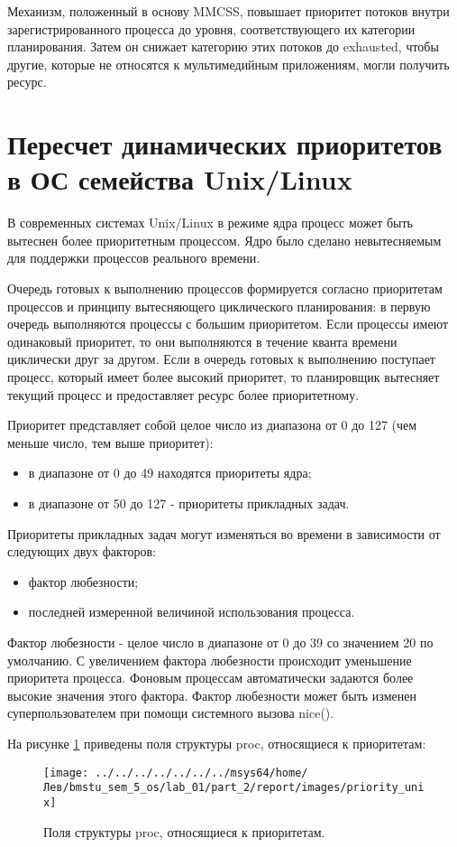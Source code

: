 Механизм, положенный в основу MMCSS, повышает приоритет потоков внутри зарегистрированного процесса до уровня, соответствующего их категории планирования. Затем он снижает категорию этих потоков до exhausted, чтобы другие, которые не относятся к мультимедийным приложениям, могли получить ресурс.

\section{Пересчет динамических приоритетов в ОС семейства Unix/Linux}
В современных системах Unix/Linux в режиме ядра процесс может быть вытеснен более приоритетным процессом. Ядро было сделано невытесняемым для поддержки процессов реального времени.

Очередь готовых к выполнению процессов формируется согласно приоритетам процессов и принципу вытесняющего циклического планирования: в первую очередь выполняются процессы с большим приоритетом. Если процессы имеют одинаковый приоритет, то они выполняются в течение кванта времени циклически друг за другом. Если в очередь готовых к выполнению поступает процесс, который имеет более высокий приоритет, то планировщик вытесняет текущий процесс и предоставляет ресурс более приоритетному.

Приоритет представляет собой целое число из диапазона от 0 до 127 (чем меньше число, тем выше приоритет):
\begin{itemize}
	\item в диапазоне от 0 до 49 находятся приоритеты ядра;
	\item в диапазоне от 50 до 127 - приоритеты прикладных задач.
\end{itemize}

Приоритеты прикладных задач могут изменяться во времени в зависимости от следующих двух факторов:
\begin{itemize}
	\item фактор любезности;
	\item последней измеренной величиной использования процесса.
\end{itemize}

Фактор любезности - целое число в диапазоне от 0 до 39 со значением 20 по умолчанию. С увеличением фактора любезности происходит уменьшение приоритета процесса. Фоновым процессам автоматически задаются более высокие значения этого фактора. Фактор любезности может быть изменен суперпользователем при помощи системного вызова nice().

На рисунке \ref{png:priority_unix} приведены поля структуры proc, относящиеся к приоритетам:
\begin{figure}[H]
	\centering
	{
		\texttt{[image: ../../../../../../../msys64/home/Лев/bmstu\_sem\_5\_os/lab\_01/part\_2/report/images/priority\_unix]}
		\caption{Поля структуры proc, относящиеся к приоритетам.}
		\label{png:priority_unix}
	}
\end{figure}

